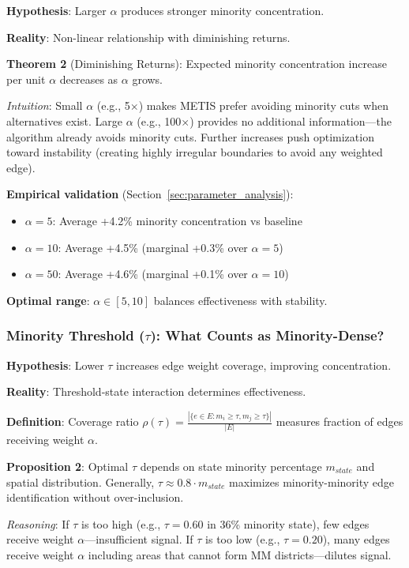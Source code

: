 \textbf{Hypothesis}: Larger $\alpha$ produces stronger minority concentration.

\textbf{Reality}: Non-linear relationship with diminishing returns.

\textbf{Theorem 2} (Diminishing Returns): Expected minority concentration increase per unit $\alpha$ decreases as $\alpha$ grows.

\textit{Intuition}: Small $\alpha$ (e.g., 5$\times$) makes METIS prefer avoiding minority cuts when alternatives exist. Large $\alpha$ (e.g., 100$\times$) provides no additional information—the algorithm already avoids minority cuts. Further increases push optimization toward instability (creating highly irregular boundaries to avoid any weighted edge).

\textbf{Empirical validation} (Section~\ref{sec:parameter_analysis}):
\begin{itemize}
\item $\alpha = 5$: Average +4.2\% minority concentration vs baseline
\item $\alpha = 10$: Average +4.5\% (marginal +0.3\% over $\alpha=5$)
\item $\alpha = 50$: Average +4.6\% (marginal +0.1\% over $\alpha=10$)
\end{itemize}

\textbf{Optimal range}: $\alpha \in [5, 10]$ balances effectiveness with stability.

\subsubsection{Minority Threshold ($\tau$): What Counts as Minority-Dense?}

\textbf{Hypothesis}: Lower $\tau$ increases edge weight coverage, improving concentration.

\textbf{Reality}: Threshold-state interaction determines effectiveness.

\textbf{Definition}: Coverage ratio $\rho(\tau) = \frac{|\{e \in E : m_i \geq \tau, m_j \geq \tau\}|}{|E|}$ measures fraction of edges receiving weight $\alpha$.

\textbf{Proposition 2}: Optimal $\tau$ depends on state minority percentage $m_{state}$ and spatial distribution. Generally, $\tau \approx 0.8 \cdot m_{state}$ maximizes minority-minority edge identification without over-inclusion.

\textit{Reasoning}: If $\tau$ is too high (e.g., $\tau = 0.60$ in 36\% minority state), few edges receive weight $\alpha$—insufficient signal. If $\tau$ is too low (e.g., $\tau = 0.20$), many edges receive weight $\alpha$ including areas that cannot form MM districts—dilutes signal.

